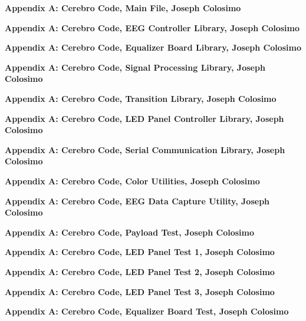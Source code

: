 \documentclass[letterpaper,9pt,notitlepage]{report}
\newcommand{\lscode}[2]{\begin{Large}\textbf{Appendix A: Cerebro Code, #1, Joseph Colosimo}\end{Large} \pagebreak}
\begin{document}
    \lscode{Main File}{../cerebro.asm}
    \lscode{EEG Controller Library}{../eegctrl.asm}
    \lscode{Equalizer Board Library}{../eqboard.asm}
    \lscode{Signal Processing Library}{../sigproc.asm}
    \lscode{Transition Library}{../trans.asm}
    \lscode{LED Panel Controller Library}{../ledpanel.asm}
    \lscode{Serial Communication Library}{../sercom.asm}
    \lscode{Color Utilities}{../colutils.asm}

    \lscode{EEG Data Capture Utility}{../eegtest/eegtest.asm}
    \lscode{Payload Test}{../pyldtest.asm}
    \lscode{LED Panel Test 1}{../ledtest/ledtest.asm}
    \lscode{LED Panel Test 2}{../ledtest/ledloopback.asm}
    \lscode{LED Panel Test 3}{../ledcycle.asm}
    \lscode{Equalizer Board Test}{../eqtest.asm}
\end{document}
